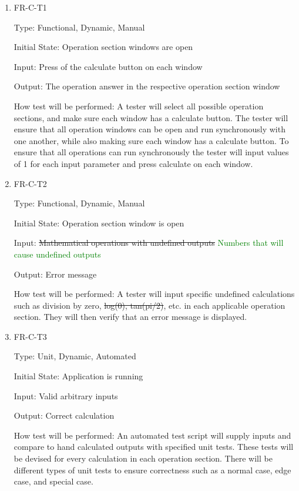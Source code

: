 \documentclass[12pt, titlepage]{article}
\begin{document}
\begin{enumerate}

\item{FR-C-T1\\}

Type: Functional, Dynamic, Manual
					
Initial State: Operation section windows are open
					
Input: Press of the calculate button on each window
					
Output: The operation answer in the respective operation section window
					
How test will be performed: A tester will select all possible operation sections, and make sure each window has a calculate button. The tester will ensure that all operation windows can be open and run synchronously with one another, while also making sure each window has a calculate button. To ensure that all operations can run synchronously the tester will input values of 1 for each input parameter and press calculate on each window.
					
\item{FR-C-T2\\}

Type: Functional, Dynamic, Manual
					
Initial State: Operation section window is open 
					
Input: \sout{Mathematical operations with undefined outputs} \textcolor{Green}{Numbers that will cause undefined outputs}
					
Output: Error message

How test will be performed: A tester will input specific undefined calculations such as division by zero, \sout{log(0), tan(pi/2)}, etc. in each applicable operation section. They will then verify that an error message is displayed.


\item{FR-C-T3\\}

Type: Unit, Dynamic, Automated
					
Initial State: Application is running
					
Input: Valid arbitrary inputs
					
Output: Correct calculation

How test will be performed: An automated test script will supply inputs and compare to hand calculated outputs with specified unit tests. These tests will be devised for every calculation in each operation section. There will be different types of unit tests to ensure correctness such as a normal case, edge case, and special case.

\end{enumerate}
\end{document}
